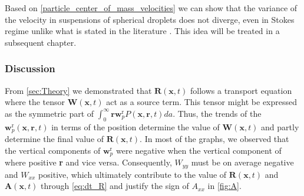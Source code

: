 Based on \ref{particle_center_of_mass_velocities} we can show that the variance of the velocity in suspensions of spherical droplets does not diverge, even in Stokes regime unlike what is stated in the literature \citep{caflisch1985variance}. 
This idea will be treated in a subsequent chapter. 

\subsubsection{Discussion}

    

From \ref{sec:Theory} we demonstrated that $\textbf{R}(\textbf{x},t)$ follows a transport equation where the tensor $\textbf{W}(\textbf{x},t)$ act as a source term. 
This tensor might be expressed as the symmetric part of $\int_0^\infty \textbf{r} \textbf{w}_p^\text{r} P(\textbf{x},\textbf{r},t) da$. 
Thus, the trends of the $\textbf{w}_p^\text{r}(\textbf{x},\textbf{r},t) $ in terms of the position determine the value of $\textbf{W}(\textbf{x},t)$ and partly determine the final value of $\textbf{R}(\textbf{x},t)$. 
In most of the graphs, we observed that the vertical components of $\textbf{w}_p^\text{r}$ were negative when the vertical component of where positive \textbf{r} and vice versa. 
Consequently, $W_{yy}$ must be on average negative and $W_{xx}$ positive, which ultimately contribute to the value of $\textbf{R}(\textbf{x},t)$ and $\textbf{A}(\textbf{x},t)$ through \ref{eq:dt_R} and justify the sign of $A_{xx}$ in \ref{fig:A}. 

